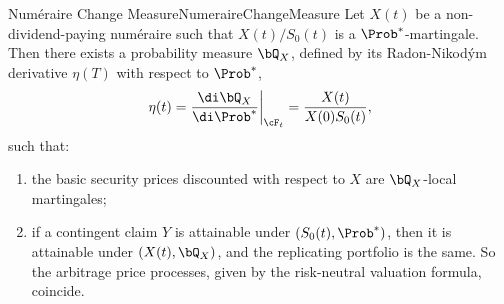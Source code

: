 \begin{thm}{Numéraire Change Measure}{NumeraireChangeMeasure}
	Let $X(t)$ be a non-dividend-paying num\'{e}raire such that $X(t)/S_0(t)$ is a $\Prob^*$-martingale. Then there exists a probability measure $\bQ_X$, defined by its Radon-Nikodým derivative $\eta(T)$ with respect to $\Prob^*$,
	\[
		\eta(t) = \frac{\di \bQ_X}{\di \Prob^*} \bigg|_{\cF_t} = \frac{X(t)}{X(0)S_0(t)},
	\]
	such that:
	\begin{enumerate}[label=(\roman*), ref=(\roman*), leftmargin=*]
		\item the basic security prices discounted with respect to $X$ are $\bQ_X$-local martingales;
		\item if a contingent claim $Y$ is attainable under $(S_0(t), \Prob^*)$, then it is attainable under $(X(t), \bQ_X)$, and the replicating portfolio is the same. So the arbitrage price processes, given by the risk-neutral valuation formula, coincide.
	\end{enumerate}
\end{thm}


